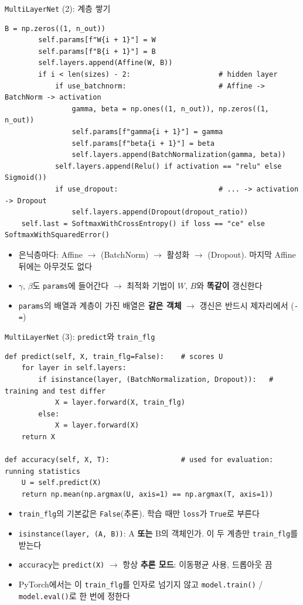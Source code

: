 \documentclass[aspectratio=169,11pt]{beamer}
\newcommand{\codesmall}{\ttfamily\fontsize{7.4}{8.3}\selectfont}
\newcommand{\code}[1]{\texttt{#1}}
\begin{document}
\begin{frame}[fragile]{\code{MultiLayerNet} (2): 계층 쌓기}
\begin{lstlisting}[basicstyle=\codesmall]
        B = np.zeros((1, n_out))
        self.params[f"W{i + 1}"] = W
        self.params[f"B{i + 1}"] = B
        self.layers.append(Affine(W, B))
        if i < len(sizes) - 2:                     # hidden layer
            if use_batchnorm:                      # Affine -> BatchNorm -> activation
                gamma, beta = np.ones((1, n_out)), np.zeros((1, n_out))
                self.params[f"gamma{i + 1}"] = gamma
                self.params[f"beta{i + 1}"] = beta
                self.layers.append(BatchNormalization(gamma, beta))
            self.layers.append(Relu() if activation == "relu" else Sigmoid())
            if use_dropout:                        # ... -> activation -> Dropout
                self.layers.append(Dropout(dropout_ratio))
    self.last = SoftmaxWithCrossEntropy() if loss == "ce" else SoftmaxWithSquaredError()
\end{lstlisting}
\small
\begin{itemize}
\item 은닉층마다: Affine $\to$ (BatchNorm) $\to$ 활성화 $\to$ (Dropout). 마지막 Affine 뒤에는 아무것도 없다
\item $\gamma$, $\beta$도 \code{params}에 들어간다 $\to$ 최적화 기법이 $W$, $B$와 \textbf{똑같이} 갱신한다
\item \code{params}의 배열과 계층이 가진 배열은 \textbf{같은 객체} $\to$ 갱신은 반드시 제자리에서 (\code{-=})
\end{itemize}
\end{frame}

\begin{frame}[fragile]{\code{MultiLayerNet} (3): \code{predict}와 \code{train\_flg}}
\begin{lstlisting}
def predict(self, X, train_flg=False):    # scores U
    for layer in self.layers:
        if isinstance(layer, (BatchNormalization, Dropout)):   # training and test differ
            X = layer.forward(X, train_flg)
        else:
            X = layer.forward(X)
    return X

def accuracy(self, X, T):                 # used for evaluation: running statistics
    U = self.predict(X)
    return np.mean(np.argmax(U, axis=1) == np.argmax(T, axis=1))
\end{lstlisting}
\begin{itemize}
\item \code{train\_flg}의 기본값은 \code{False}(추론). 학습 때만 \code{loss}가 \code{True}로 부른다
\item \code{isinstance(layer, (A, B))}: A \textbf{또는} B의 객체인가. 이 두 계층만 \code{train\_flg}를 받는다
\item \code{accuracy}는 \code{predict(X)} $\to$ 항상 \textbf{추론 모드}: 이동평균 사용, 드롭아웃 끔
\item PyTorch에서는 이 \code{train\_flg}를 인자로 넘기지 않고 \code{model.train()} / \code{model.eval()}로 한 번에 정한다
\end{itemize}
\end{frame}
\end{document}
